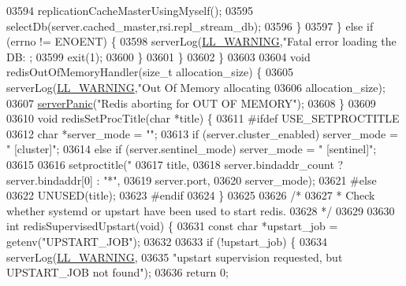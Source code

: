 \begin{DoxyCode}
{{{{{{{{{{{{{{{{{{{{{{{{{{{{{{{{{{{{{{{{{{{{{{{{{{{{{{{{{{{{{{{{{{{{{{{{{{{{{{{{{{{{{{{{{{{{{{{{{{{{{{{{{{{{{{{{{{{{{{{{{{{{{{{{{{{{{{{{{{{{{{{{{{{{{{{{{{{{{{{{{{{{{{{{{{{{{{03594                 replicationCacheMasterUsingMyself();
03595                 selectDb(server.cached\_master,rsi.repl\_stream\_db);
03596             \}
03597         \} \textcolor{keywordflow}{else} \textcolor{keywordflow}{if} (errno != ENOENT) \{
03598             serverLog(\hyperlink{server_8h_a31229b9334bba7d6be2a72970967a14b}{LL\_WARNING},\textcolor{stringliteral}{"Fatal error loading the DB: %
      ;
03599             exit(1);
03600         \}
03601     \}
03602 \}
03603 
03604 \textcolor{keywordtype}{void} redisOutOfMemoryHandler(size\_t allocation\_size) \{
03605     serverLog(\hyperlink{server_8h_a31229b9334bba7d6be2a72970967a14b}{LL\_WARNING},\textcolor{stringliteral}{"Out Of Memory allocating %
03606         allocation\_size);
03607     \hyperlink{server_8h_a11cc378e7778a830b41240578de3b204}{serverPanic}(\textcolor{stringliteral}{"Redis aborting for OUT OF MEMORY"});
03608 \}
03609 
03610 \textcolor{keywordtype}{void} redisSetProcTitle(\textcolor{keywordtype}{char} *title) \{
03611 \textcolor{preprocessor}{#}\textcolor{preprocessor}{ifdef} USE\_SETPROCTITLE
03612     \textcolor{keywordtype}{char} *server\_mode = \textcolor{stringliteral}{""};
03613     \textcolor{keywordflow}{if} (server.cluster\_enabled) server\_mode = \textcolor{stringliteral}{" [cluster]"};
03614     \textcolor{keywordflow}{else} \textcolor{keywordflow}{if} (server.sentinel\_mode) server\_mode = \textcolor{stringliteral}{" [sentinel]"};
03615 
03616     setproctitle(\textcolor{stringliteral}{"%
03617         title,
03618         server.bindaddr\_count ? server.bindaddr[0] : \textcolor{stringliteral}{"*"},
03619         server.port,
03620         server\_mode);
03621 \textcolor{preprocessor}{#}\textcolor{preprocessor}{else}
03622     UNUSED(title);
03623 \textcolor{preprocessor}{#}\textcolor{preprocessor}{endif}
03624 \}
03625 
03626 \textcolor{comment}{/*}
03627 \textcolor{comment}{ * Check whether systemd or upstart have been used to start redis.}
03628 \textcolor{comment}{ */}
03629 
03630 \textcolor{keywordtype}{int} redisSupervisedUpstart(\textcolor{keywordtype}{void}) \{
03631     \textcolor{keyword}{const} \textcolor{keywordtype}{char} *upstart\_job = getenv(\textcolor{stringliteral}{"UPSTART\_JOB"});
03632 
03633     \textcolor{keywordflow}{if} (!upstart\_job) \{
03634         serverLog(\hyperlink{server_8h_a31229b9334bba7d6be2a72970967a14b}{LL\_WARNING},
03635                 \textcolor{stringliteral}{"upstart supervision requested, but UPSTART\_JOB not found"});
03636         \textcolor{keywordflow}{return} 0;
}}}}}}}}}}}}}}}}}}}}}}}}}}}}}}}}}}}}}}}}}}}}}}}}}}}}}}}}}}}}}}}}}}}}}}}}}}}}}}}}}}}}}}}}}}}}}}}}}}}}}}}}}}}}}}}}}}}}}}}}}}}}}}}}}}}}}}}}}}}}}}}}}}}}}}}}}}}}}}}}}}}}}}}}}}}}}}}}}
\end{DoxyCode}
